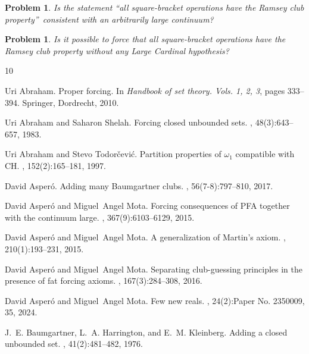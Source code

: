\documentclass{article}
\newtheorem{problem}[theorem]{Problem}
\begin{document}
\begin{problem}
Is the statement \textquotedblleft all square-bracket operations have the
Ramsey club property\textquotedblright\ consistent with an arbitrarily large continuum?
\end{problem}

\begin{problem}
Is it possible to force that all square-bracket operations have the Ramsey
club property without any Large Cardinal hypothesis?
\end{problem}

\def\cprime{$'$}
\begin{thebibliography}{10}

Uri Abraham.
\newblock Proper forcing.
\newblock In {\em Handbook of set theory. {V}ols. 1, 2, 3}, pages 333--394.
  Springer, Dordrecht, 2010.

Uri Abraham and Saharon Shelah.
\newblock Forcing closed unbounded sets.
, 48(3):643--657, 1983.

Uri Abraham and Stevo Todor\v{c}evi\'{c}.
\newblock Partition properties of {$\omega_1$} compatible with {CH}.
, 152(2):165--181, 1997.

David Asper\'{o}.
\newblock Adding many {B}aumgartner clubs.
, 56(7-8):797--810, 2017.

David Asper\'{o} and Miguel~Angel Mota.
\newblock Forcing consequences of {PFA} together with the continuum large.
, 367(9):6103--6129, 2015.

David Asper\'{o} and Miguel~Angel Mota.
\newblock A generalization of {M}artin's axiom.
, 210(1):193--231, 2015.

David Asper\'{o} and Miguel~Angel Mota.
\newblock Separating club-guessing principles in the presence of fat forcing
  axioms.
, 167(3):284--308, 2016.

David Asper\'{o} and Miguel~Angel Mota.
\newblock Few new reals.
, 24(2):Paper No. 2350009, 35, 2024.

J.~E. Baumgartner, L.~A. Harrington, and E.~M. Kleinberg.
\newblock Adding a closed unbounded set.
, 41(2):481--482, 1976.


\end{thebibliography}
\end{document}
